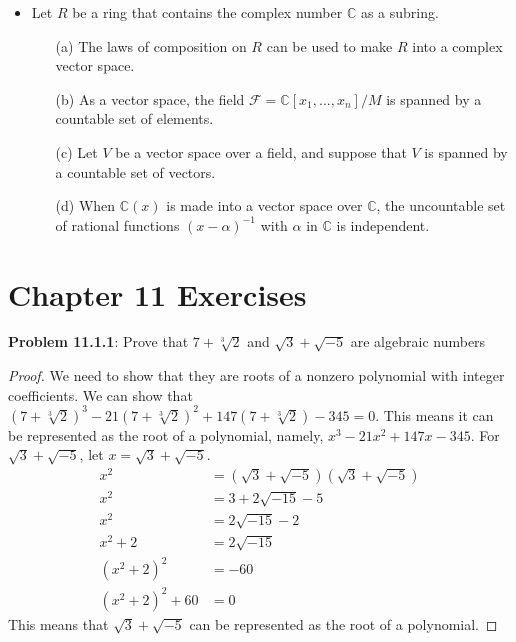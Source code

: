 \documentclass[12pt]{article}
\begin{document}
\begin{itemize}
  \item Let $R$ be a ring that contains the complex number $\mathbb{C}$ as a subring.
  \begin{enumerate}
    \item[(a)] The laws of composition on $R$ can be used to make $R$ into a complex vector space.
    \item[(b)] As a vector space, the field $\mathcal{F} = \mathbb{C}[x_1,...,x_n]/M$ is spanned by a countable set of elements.
    \item[(c)] Let $V$ be a vector space over a field, and suppose that $V$ is spanned by a countable set of vectors.
    \item[(d)] When $\mathbb{C}(x)$ is made into a vector space over $\mathbb{C}$, the uncountable set of rational functions $(x - \alpha)^{-1}$ with $\alpha$ in $\mathbb{C}$ is independent.
  \end{enumerate}
\end{itemize}

\newpage
\section*{Chapter 11 Exercises}
\textbf{Problem 11.1.1}: Prove that $7 + \sqrt[3]{2}$ and $\sqrt{3} + \sqrt{-5}$ are algebraic numbers
\begin{proof}
We need to show that they are roots of a nonzero polynomial with integer coefficients. We can show that $(7 + \sqrt[3]{2})^3 - 21(7 + \sqrt[3]{2})^2 + 147(7 + \sqrt[3]{2}) - 345 = 0$. This means it can be represented as the root of a polynomial, namely, $x^3 - 21x^2 + 147x - 345$. For $\sqrt{3} + \sqrt{-5}$, let $x = \sqrt{3} + \sqrt{-5}$.
\begin{align*}
  x^2 &= (\sqrt{3} + \sqrt{-5})(\sqrt{3} + \sqrt{-5}) \\
  x^2 &= 3 + 2\sqrt{-15} - 5 \\
  x^2 &= 2\sqrt{-15} - 2 \\
  x^2 + 2 &= 2\sqrt{-15} \\
  (x^2 + 2)^2 &= -60 \\
  (x^2 + 2)^2 + 60 &= 0
\end{align*}
This means that $\sqrt{3} + \sqrt{-5}$ can be represented as the root of a polynomial.
\end{proof}
\end{document}

